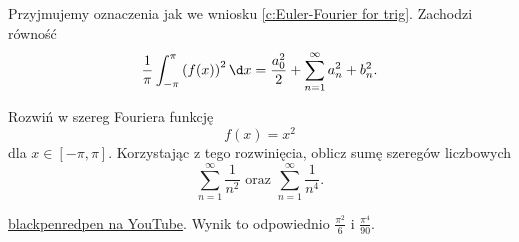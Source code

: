 \begin{corollary}
    Przyjmujemy oznaczenia jak we wniosku \ref{c:Euler-Fourier for trig}. Zachodzi równość
    \[ \frac{1}{\pi}\int_{-\pi}^\pi \left(f(x)\right)^2 \d x = \frac{a_0^2}{2} + \sum_{n=1}^\infty a_n^2 + b_n^2. \]
\end{corollary}

\begin{example}
    Rozwiń w szereg Fouriera funkcję
    \[ f(x) = x^2 \]
    dla $x \in [-\pi, \pi]$. Korzystając z tego rozwinięcia, oblicz sumę szeregów liczbowych
    \[ \sum_{n=1}^\infty \frac{1}{n^2} \text{ oraz } \sum_{n=1}^\infty \frac{1}{n^4}. \]
\end{example}
\begin{solution}
    \href{https://www.youtube.com/watch?v=2VYBGF_MPIU}{blackpenredpen na YouTube}. Wynik to odpowiednio $\frac{\pi^2}{6}$ i $\frac{\pi^4}{90}$.
\end{solution}